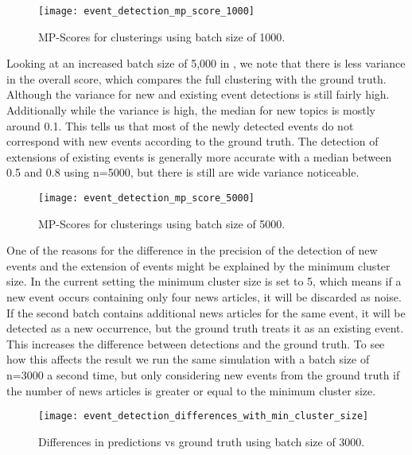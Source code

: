 \begin{figure}[h]
    \centering
    \texttt{[image: event\_detection\_mp\_score\_1000]}
    \caption{MP-Scores for clusterings using batch size of 1000.}
    \label{fig:event_detection_mp_score_1000}
\end{figure}

Looking at an increased batch size of 5,000 in ,
we note that there is less variance in the overall score, which compares the full clustering with the ground truth.
Although the variance for new and existing event detections is still fairly high.
Additionally while the variance is high, the median for new topics is mostly around 0.1.
This tells us that most of the newly detected events do not correspond with new events according to the ground truth.
The detection of extensions of existing events is generally more accurate
with a median between 0.5 and 0.8 using n=5000, but there is still are wide variance noticeable.

\begin{figure}[h]
    \centering
    \texttt{[image: event\_detection\_mp\_score\_5000]}
    \caption{MP-Scores for clusterings using batch size of 5000.}
    \label{fig:event_detection_mp_score_5000}
\end{figure}

One of the reasons for the difference in the precision of the detection of new events and the extension of events
might be explained by the minimum cluster size.
In the current setting the minimum cluster size is set to 5,
which means if a new event occurs containing only four news articles,
it will be discarded as noise.
If the second batch contains additional news articles for the same event,
it will be detected as a new occurrence, but the ground truth treats it as an existing event. 
This increases the difference between detections and the ground truth.
To see how this affects the result we run the same simulation with a batch size of n=3000 a second time,
but only considering new events from the ground truth
if the number of news articles is greater or equal to the minimum cluster size.

\begin{figure}[h]
    \centering
    \texttt{[image: event\_detection\_differences\_with\_min\_cluster\_size]}
    \caption{Differences in predictions vs ground truth using batch size of 3000.}
    \label{fig:event_detection_differences_with_min_cluster_size}
\end{figure}

